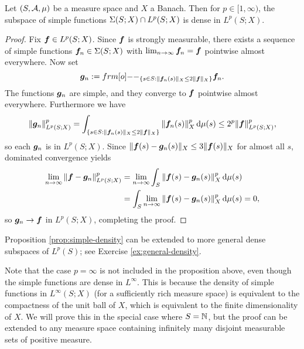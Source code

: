 \begin{prop}\label{prop:simple-density}
  Let $(S,\mathcal{A},\mu)$ be a measure space and $X$ a Banach.
  Then for $p \in [1,\infty)$, the subspace of simple functions $\Sigma(S;X) \cap L^p(S;X)$ is dense in $L^p(S;X)$.
\end{prop}

\begin{proof}
  Fix $\bm{f} \in L^p(S;X)$.
  Since $\bm{f}$ is strongly measurable, there exists a sequence of simple functions $\bm{f}_n \in \Sigma(S;X)$ with $\lim_{n \to \infty} \bm{f}_n = \bm{f}$ pointwise almost everywhere.
  Now set
  \begin{equation*}
    \mb{g}_n := \1_{ \{s \in S : \|\mb{f}_n(s)\|_X \leq 2\|\mb{f}\|_X\} } \mb{f}_n.
  \end{equation*}
  The functions $\bm{g}_n$ are simple, and they converge to $\bm{f}$ pointwise almost everywhere.
  Furthermore we have
  \begin{equation*}
    \|\bm{g}_n\|_{L^p(S;X)}^p = \int_{\{s \in S : \|\bm{f}_n(s)\|_X \leq 2\|\bm{f}\|_X \} } \|\bm{f}_n(s)\|_X^p \, \mathrm{d}\mu(s) \leq 2^p \|\bm{f}\|_{L^p(S;X)}^p,
  \end{equation*}
  so each $\bm{g}_n$ is in $L^p(S;X)$.
  Since $\|\bm{f}(s) - \bm{g}_n(s)\|_X \leq 3\|\bm{f}(s)\|_X$ for almost all $s$, dominated convergence yields
  \begin{equation*}
    \begin{aligned}
      \lim_{n \to \infty} \|\bm{f} - \bm{g}_n\|_{L^p(S;X)}^p &= \lim_{n \to \infty} \int_S \|\bm{f}(s) - \bm{g}_n(s)\|_{X}^p \, \mathrm{d}\mu(s) \\
      &= \int_S \lim_{n \to \infty}  \|\bm{f}(s) - \bm{g}_n(s)\|_{X}^p \, \mathrm{d}\mu(s) = 0,
    \end{aligned}
  \end{equation*}
  so $\bm{g}_n \to \bm{f}$ in $L^p(S;X)$, completing the proof.
\end{proof}


\begin{rmk}
  Proposition \ref{prop:simple-density} can be extended to more general dense subspaces of $L^p(S)$; see Exercise \ref{ex:general-density}.
\end{rmk}

Note that the case $p = \infty$ is not included in the proposition above, even though the simple functions are dense in $L^\infty$.
This is because the density of simple functions in $L^\infty(S;X)$ (for a sufficiently rich measure space) is equivalent to the compactness of the unit ball of $X$, which is equivalent to the finite dimensionality of $X$.
We will prove this in the special case where $S = \mathbb{N}$, but the proof can be extended to any measure space containing infinitely many disjoint measurable sets of positive measure.

